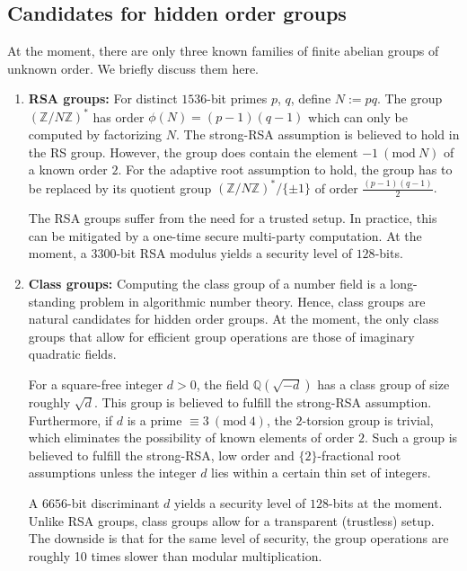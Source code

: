 \documentclass[11pt, lettersize, notitlepage, leqno, footskip=0.6cm]{article}
\newcommand{\bz}{\mathbb Z}
\newcommand{\bq}{\mathbb Q}
\newcommand{\vs}{\vspace{-0.15cm}}
\newcommand{\Mod}[1]{\ (\mathrm{mod}\ #1)}
\numberwithin{equation}{section}
\begin{document}
\subsection{\fontsize{11}{11}\selectfont Candidates for hidden order groups }

At the moment, there are only three known families of finite abelian groups of unknown order. We briefly discuss them here.\vspace{0.2cm} \begin{enumerate}[wide, labelwidth=!, labelindent=0pt] \vs

\item \textbf{RSA groups:} For distinct $1536$-bit primes $p$, $q$, define $N:= pq$. The group $(\bz/N\bz)^*$ has order $\phi(N) = (p-1)(q-1)$ which can only be computed by factorizing $N$. The strong-RSA assumption is believed to hold in the RS group. However, the group does contain the element $-1\Mod{N}$ of a known order $2$. For the adaptive root assumption to hold, the group has to be replaced by its quotient group $(\bz/N\bz)^*/\{\pm 1\}$ of order $\frac{(p-1)(q-1)}{2}.$ 

The RSA groups suffer from the need for a trusted setup. In practice, this can be mitigated by a one-time secure multi-party computation. At the moment, a $3300$-bit RSA modulus yields a security level of $128$-bits.


\item \textbf{Class groups:} Computing the class group of a number field is a long-standing problem in algorithmic number theory. Hence, class groups are natural candidates for hidden order groups. At the moment, the only class groups that allow for efficient group operations are those of imaginary quadratic fields.

For a square-free integer $d > 0$, the field $\bq(\sqrt{-d})$ has a class group of size roughly $\sqrt{d}$. This group is believed to fulfill the strong-RSA assumption. Furthermore, if $d$ is a prime $\equiv 3 \Mod{4}$, the $2$-torsion group is trivial, which eliminates the possibility of known elements of order $2$. Such a group is believed to fulfill the strong-RSA, low order and $\{2\}$-fractional root assumptions unless the integer $d$ lies within a certain thin set of integers.

A $6656$-bit discriminant $d$ yields a security level of $128$-bits at the moment. Unlike RSA groups, class groups allow for a transparent (trustless) setup. The downside is that for the same level of security, the group operations are roughly 10 times slower than modular multiplication.


\end{enumerate}
\end{document}
